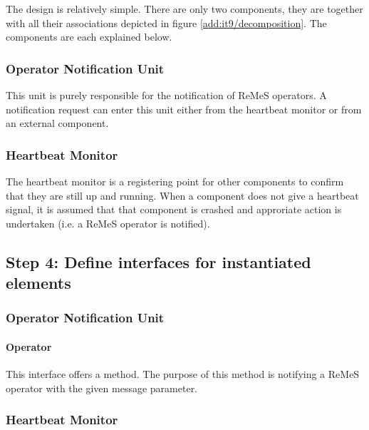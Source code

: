 \npar The design is relatively simple. There are only two components, they are
together with all their associations depicted in figure
\ref{add:it9/decomposition}. The components are each explained below.
\subsubsection{Operator Notification Unit}

\npar This unit is purely responsible for the notification of ReMeS operators. A
notification request can enter this unit either from the heartbeat monitor or
from an external component.

\subsubsection{Heartbeat Monitor}

\npar The heartbeat monitor is a registering point for other components to
confirm that they are still up and running. When a component does not give a
heartbeat signal, it is assumed that that component is crashed and approriate
action is undertaken (i.e. a ReMeS operator is notified).

\subsection{Step 4: Define interfaces for instantiated elements}
\label{add:it9/interfaces}

\subsubsection{Operator Notification Unit}

\paragraph{Operator}
\npar This interface offers a  method. The
purpose of this method is notifying a ReMeS operator with the given message
parameter. 

\subsubsection{Heartbeat Monitor}

